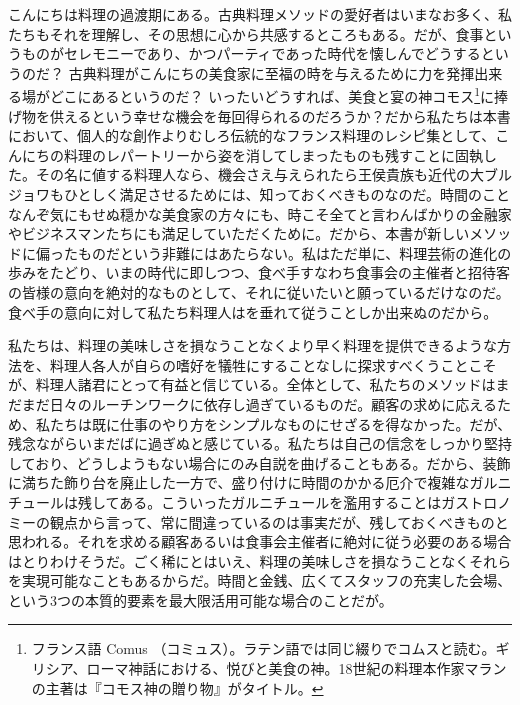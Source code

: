\begin{main}
こんにちは料理の過渡期にある。古典料理メソッドの愛好者はいまなお多く、私たちもそれを理解し、その思想に心から共感するところもある。だが、食事というものがセレモニーであり、かつパーティであった時代を懐しんでどうするというのだ？
古典料理がこんにちの美食家に至福の時を与えるために力を発揮出来る場がどこにあるというのだ？
いったいどうすれば、美食と宴の神コモス\footnote{フランス語 Comus
  （コミュス）。ラテン語では同じ綴りでコムスと読む。ギリシア、ローマ神話における、悦びと美食の神。18世紀の料理本作家マランの主著は『コモス神の贈り物』がタイトル。}に捧げ物を供えるという幸せな機会を毎回得られるのだろうか？だから私たちは本書において、個人的な創作よりむしろ伝統的なフランス料理のレシピ集として、こんにちの料理のレパートリーから姿を消してしまったものも残すことに固執した。その名に値する料理人なら、機会さえ与えられたら王侯貴族も近代の大ブルジョワもひとしく満足させるためには、知っておくべきものなのだ。時間のことなんぞ気にもせぬ穏かな美食家の方々にも、時こそ全てと言わんばかりの金融家やビジネスマンたちにも満足していただくために。だから、本書が新しいメソッドに偏ったものだという非難にはあたらない。私はただ単に、料理芸術の進化の歩みをたどり、いまの時代に即しつつ、食べ手すなわち食事会の主催者と招待客の皆様の意向を絶対的なものとして、それに従いたいと願っているだけなのだ。食べ手の意向に対して私たち料理人はを垂れて従うことしか出来ぬのだから。

私たちは、料理の美味しさを損なうことなくより早く料理を提供できるような方法を、料理人各人が自らの嗜好を犠牲にすることなしに探求すべくうことこそが、料理人諸君にとって有益と信じている。全体として、私たちのメソッドはまだまだ日々のルーチンワークに依存し過ぎているものだ。顧客の求めに応えるため、私たちは既に仕事のやり方をシンプルなものにせざるを得なかった。だが、残念ながらいまだばに過ぎぬと感じている。私たちは自己の信念をしっかり堅持しており、どうしようもない場合にのみ自説を曲げることもある。だから、装飾に満ちた飾り台を廃止した一方で、盛り付けに時間のかかる厄介で複雑なガルニチュールは残してある。こういったガルニチュールを濫用することはガストロノミーの観点から言って、常に間違っているのは事実だが、残しておくべきものと思われる。それを求める顧客あるいは食事会主催者に絶対に従う必要のある場合はとりわけそうだ。ごく稀にとはいえ、料理の美味しさを損なうことなくそれらを実現可能なこともあるからだ。時間と金銭、広くてスタッフの充実した会場、という3つの本質的要素を最大限活用可能な場合のことだが。


\end{main}

